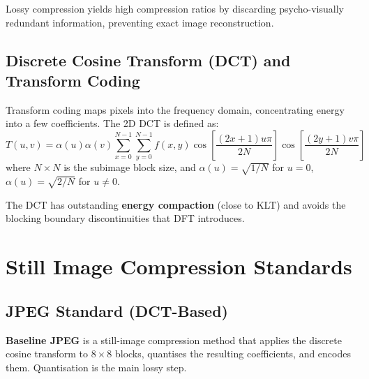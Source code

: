 \documentclass[12pt,a4paper]{article}
\begin{document}
Lossy compression yields high compression ratios by discarding psycho-visually redundant information, preventing exact image reconstruction.

\subsection{Discrete Cosine Transform (DCT) and Transform Coding}
Transform coding maps pixels into the frequency domain, concentrating energy into a few coefficients. The 2D DCT is defined as:
\begin{equation}
  T(u,v) = \alpha(u)\alpha(v) \sum_{x=0}^{N-1} \sum_{y=0}^{N-1} f(x,y) \cos\left[ \frac{(2x+1)u\pi}{2N} \right] \cos\left[ \frac{(2y+1)v\pi}{2N} \right]
\end{equation}
where $N \times N$ is the subimage block size, and $\alpha(u) = \sqrt{1/N}$ for $u=0$, $\alpha(u) = \sqrt{2/N}$ for $u \neq 0$.
\par\noindent
The DCT has outstanding \textbf{energy compaction} (close to KLT) and avoids the blocking boundary discontinuities that DFT introduces.

\section{Still Image Compression Standards}

\subsection{JPEG Standard (DCT-Based)}
\begin{tcolorbox}[defbox, title={Baseline JPEG}]
\textbf{Baseline JPEG} is a still-image compression method that applies the discrete cosine transform to $8\times8$ blocks, quantises the resulting coefficients, and encodes them. Quantisation is the main lossy step.
\end{tcolorbox}
\end{document}
